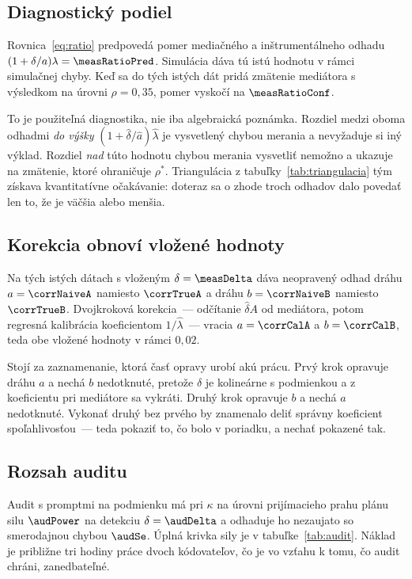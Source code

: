 \subsection{Diagnostický podiel}

Rovnica~\eqref{eq:ratio} predpovedá pomer mediačného a inštrumentálneho odhadu $(1+\delta/a)\lambda = \measRatioPred$. Simulácia dáva tú istú hodnotu v rámci simulačnej chyby. Keď sa do tých istých dát pridá zmätenie mediátora s výsledkom na úrovni $\rho=0{,}35$, pomer vyskočí na $\measRatioConf$.

To je použiteľná diagnostika, nie iba algebraická poznámka. Rozdiel medzi oboma odhadmi \emph{do výšky} $(1+\hat\delta/\hat a)\hat\lambda$ je vysvetlený chybou merania a nevyžaduje si iný výklad. Rozdiel \emph{nad} túto hodnotu chybou merania vysvetliť nemožno a ukazuje na zmätenie, ktoré ohraničuje $\rho^\ast$. Triangulácia z tabuľky~\ref{tab:triangulacia} tým získava kvantitatívne očakávanie: doteraz sa o zhode troch odhadov dalo povedať len to, že je väčšia alebo menšia.

\subsection{Korekcia obnoví vložené hodnoty}

Na tých istých dátach s vloženým $\delta=\measDelta$ dáva neopravený odhad dráhu $a=\corrNaiveA$ namiesto $\corrTrueA$ a dráhu $b=\corrNaiveB$ namiesto $\corrTrueB$. Dvojkroková korekcia~--- odčítanie $\hat\delta A$ od mediátora, potom regresná kalibrácia koeficientom $1/\hat\lambda$~--- vracia $a=\corrCalA$ a $b=\corrCalB$, teda obe vložené hodnoty v rámci $0{,}02$.

Stojí za zaznamenanie, ktorá časť opravy urobí akú prácu. Prvý krok opravuje dráhu $a$ a nechá $b$ nedotknuté, pretože $\delta$ je kolineárne s podmienkou a z koeficientu pri mediátore sa vykráti. Druhý krok opravuje $b$ a nechá $a$ nedotknuté. Vykonať druhý bez prvého by znamenalo deliť správny koeficient spoľahlivosťou~--- teda pokaziť to, čo bolo v poriadku, a nechať pokazené tak.

\subsection{Rozsah auditu}

Audit s \audN{} promptmi na podmienku má pri $\kappa$ na úrovni prijímacieho prahu plánu silu $\audPower$ na detekciu $\delta=\audDelta$ a odhaduje ho nezaujato so smerodajnou chybou $\audSe$. Úplná krivka sily je v tabuľke~\ref{tab:audit}. Náklad je približne tri hodiny práce dvoch kódovateľov, čo je vo vzťahu k tomu, čo audit chráni, zanedbateľné.

